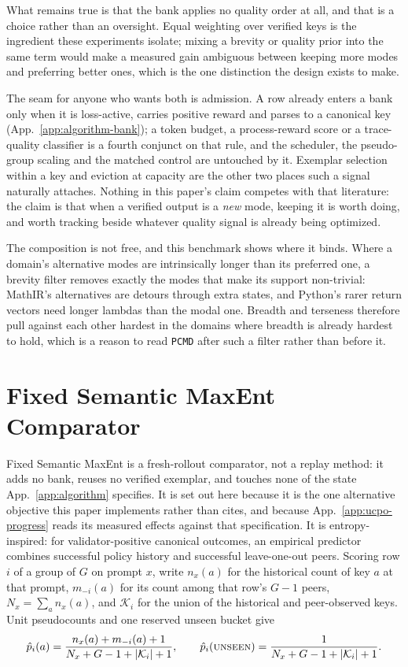 \documentclass{article}
\newcommand{\1}{\mathbf 1}
\newcommand{\pmd}{\texttt{PCMD}}
\theoremstyle{remark}
\theoremstyle{definition}
\theoremstyle{plain}
\begin{document}
What remains true is that the bank applies no quality order at all, and that
is a choice rather than an oversight. Equal weighting over verified keys is
the ingredient these experiments isolate; mixing a brevity or quality prior
into the same term would make a measured gain ambiguous between keeping more
modes and preferring better ones, which is the one distinction the design
exists to make.

The seam for anyone who wants both is admission. A row already enters a bank
only when it is loss-active, carries positive reward and parses to a canonical
key (App.~\ref{app:algorithm-bank}); a token budget, a process-reward score or
a trace-quality classifier is a fourth conjunct on that rule, and the
scheduler, the pseudo-group scaling and the matched control are untouched by
it. Exemplar selection within a key and eviction at capacity are the other two
places such a signal naturally attaches. Nothing in this paper's claim
competes with that literature: the claim is that when a verified output is a
\emph{new} mode, keeping it is worth doing, and worth tracking beside whatever
quality signal is already being optimized.

The composition is not free, and this benchmark shows where it binds. Where a
domain's alternative modes are intrinsically longer than its preferred one, a
brevity filter removes exactly the modes that make its support non-trivial:
MathIR's alternatives are detours through extra states, and Python's rarer
return vectors
need longer lambdas than the modal one. Breadth and terseness therefore pull
against each other hardest in the domains where breadth is already hardest to
hold, which is a reason to read \pmd{} after such a filter rather than before
it.

\section{Fixed Semantic MaxEnt Comparator}
\label{app:semantic-maxent}

Fixed Semantic MaxEnt is a fresh-rollout comparator, not a replay method: it
adds no bank, reuses no verified exemplar, and touches none of the state
App.~\ref{app:algorithm} specifies. It is set out here because it is the one
alternative objective this paper implements rather than cites, and because
App.~\ref{app:ucpo-progress} reads its measured effects against that
specification. It is entropy-inspired: for validator-positive canonical
outcomes, an empirical predictor combines successful policy history and
successful leave-one-out peers. Scoring row $i$ of a group of $G$ on prompt
$x$, write $n_x(a)$ for the historical count of key $a$ at that prompt,
$m_{-i}(a)$ for its count among that row's $G-1$ peers,
$N_x=\sum_a n_x(a)$, and $\mathcal K_i$ for the union of the historical and
peer-observed keys. Unit pseudocounts and one reserved unseen bucket give
\begin{equation}
  \hat p_i(a)=\frac{n_x(a)+m_{-i}(a)+1}{N_x+G-1+|\mathcal K_i|+1},\qquad
  \hat p_i(\textsc{unseen})=\frac{1}{N_x+G-1+|\mathcal K_i|+1}.
  \label{eq:open-set-predictor}
\end{equation}
\end{document}
